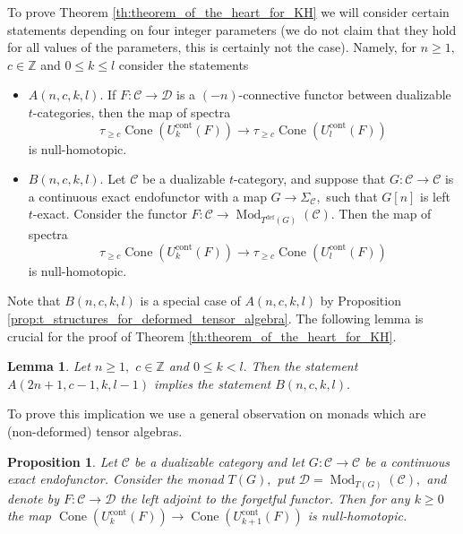 \documentclass[11pt,leqno]{amsart}
\newtheorem{lemma}[theo]{Lemma}
\newtheorem{prop}[theo]{Proposition}
\numberwithin{equation}{section}
\def\Z{\mathbb{Z}}
\newcommand{\Cone}{\operatorname{Cone}}
\newcommand{\cont}{\operatorname{cont}}
\newcommand{\deff}{\operatorname{def}}
\newcommand{\cD}{{\mathcal D}}
\newcommand{\cC}{{\mathcal C}}
\newcommand{\Mod}{\operatorname{Mod}}
\begin{document}
To prove Theorem \ref{th:theorem_of_the_heart_for_KH} we will consider certain statements depending on four integer parameters (we do not claim that they hold for all values of the parameters, this is certainly not the case). Namely, for $n\geq 1,$ $c\in\Z$ and $0\leq k\leq l$ consider the statements

\begin{itemize}
	\item $A(n,c,k,l).$ If $F:\cC\to\cD$ is a $(-n)$-connective functor between dualizable $t$-categories, then the map of spectra
	\begin{equation*}
	\tau_{\geq c}\Cone(U_k^{\cont}(F))\to \tau_{\geq c}\Cone(U_l^{\cont}(F))
	\end{equation*}
	is null-homotopic.
	\item $B(n,c,k,l).$ Let $\cC$ be a dualizable $t$-category, and suppose that $G:\cC\to\cC$ is a continuous exact endofunctor with a map $G\to\Sigma_{\cC},$ such that $G[n]$ is left $t$-exact. Consider the functor $F:\cC\to\Mod_{T^{\deff}(G)}(\cC).$ Then the map of spectra
	\begin{equation*}
		\tau_{\geq c}\Cone(U_k^{\cont}(F))\to \tau_{\geq c}\Cone(U_l^{\cont}(F))
	\end{equation*} 
	is null-homotopic.
\end{itemize}

Note that $B(n,c,k,l)$ is a special case of $A(n,c,k,l)$ by Proposition \ref{prop:t_structures_for_deformed_tensor_algebra}. The following lemma is crucial for the proof of Theorem \ref{th:theorem_of_the_heart_for_KH}.

\begin{lemma}\label{lem:A_implies_B}
Let $n\geq 1,$ $c\in\Z$ and $0\leq k<l.$ Then the statement $A(2n+1,c-1,k,l-1)$ implies the statement $B(n,c,k,l).$
\end{lemma}

To prove this implication we use a general observation on monads which are (non-deformed) tensor algebras. 

\begin{prop}\label{prop:A^1-action_on_tensor_algebra}
Let $\cC$ be a dualizable category and let $G:\cC\to\cC$ be a continuous exact endofunctor. Consider the monad $T(G),$ put $\cD=\Mod_{T(G)}(\cC),$ and denote by $F:\cC\to\cD$ the left adjoint to the forgetful functor. Then for any $k\geq 0$ the map $\Cone(U_k^{\cont}(F))\to\Cone(U_{k+1}^{\cont}(F))$ is null-homotopic.   
\end{prop}
\end{document}
